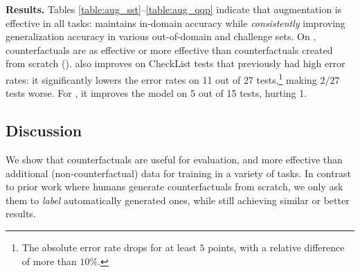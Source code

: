 \textbf{Results.}
Tables \ref{table:aug_sst}--\ref{table:aug_qqp} indicate that \sysname augmentation is effective in all tasks: \maug maintains in-domain accuracy while \emph{consistently} improving generalization accuracy in various out-of-domain and challenge sets. 
On \nli, \sysname counterfactuals are as effective or more effective than counterfactuals created from scratch (\mcad).
\sysname also improves on CheckList tests that previously had high error rates: 
it significantly lowers the error rates on 11 out of 27 \qqp tests,\footnote{The absolute error rate drops for at least $5$ points, with a relative difference of more than $10\%$.} making $2/27$ tests worse.
For \sst, it improves the model on 5 out of 15 tests, hurting 1.


\subsection{Discussion}
\label{subsec:label_efficiency}
We show that \sysname counterfactuals are useful for evaluation, and more effective than additional (non-counterfactual) data for training in a variety of tasks. 
In contrast to prior work where humans generate counterfactuals from scratch, we only ask them to \emph{label} automatically generated ones, while still achieving similar or better results.

